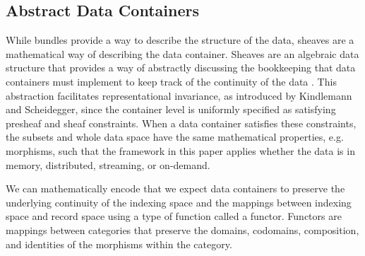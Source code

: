 \documentclass[journal]{IEEEtran}
\theoremstyle{definition}
\theoremstyle{remark}
\begin{document}
\subsection{Abstract Data Containers}
\label{sec:atct:sheaves}
While bundles provide a way to describe the structure of the data, sheaves are a mathematical way of describing the data container. Sheaves are an algebraic data structure that provides a way of abstractly discussing the bookkeeping that data containers must implement to keep track of the continuity of the data \cite{ghristElementaryAppliedTopology2014}. This abstraction facilitates representational invariance, as introduced by Kindlemann and Scheidegger\cite{kindlmannAlgebraicProcessVisualization2014}, since the container level is uniformly specified as satisfying presheaf and sheaf constraints. When a data container satisfies these constraints, the subsets and whole data space have the same mathematical properties, e.g. morphisms, such that the framework in this paper applies whether the data is in memory, distributed, streaming, or on-demand.

We can mathematically encode that we expect data containers to preserve the underlying continuity of the indexing space and the mappings between indexing space and record space using a type of function called a functor. Functors are mappings between categories that preserve the domains, codomains, composition, and identities of the morphisms within the category\cite{riehlCategoryTheoryContext}.
\end{document}
